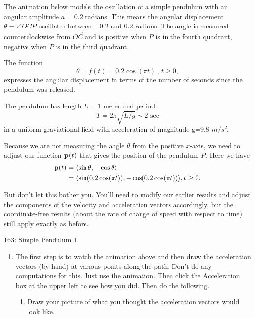 \documentclass{ximera}
\begin{document}
\begin{question} \label{Qdsf3r34r5rt}
The animation below models the oscillation of a simple pendulum with an angular amplitude $a=0.2$ radians. This means the angular displacement $\theta  = \angle OCP$ oscillates between $-0.2$ and $0.2$ radians. The angle is measured counterclockwise from $\overrightarrow{OC}$ and is positive when $P$ is in the fourth quadrant, negative when $P$ is in the third quadrant.

The function 
\[
      \theta = f(t) = 0.2 \cos (\pi t) \, , \, t\geq 0, 
\]
expresses the angular displacement in terms of the number of seconds since the pendulum was released. 

The pendulum has length $L=1$ meter and period
\[
  T  = 2\pi \sqrt{L/g} \sim 2 \text{ sec}
\]
in a uniform graviational field with acceleration of magnitude g=9.8 $m/s^2$.

Because we are not measuring the angle $\theta$ from the positive $x$-axis, we need to adjust our function ${\bf p}(t)$ that gives the position of the pendulum $P$. Here we have
\begin{align*}
   {\bf p}(t) &= \langle \sin \theta, -\cos\theta   \rangle  \\
                  &= \langle \sin (0.2 \cos (\pi t)), - \cos (0.2 \cos (\pi t)) \rangle  , t \geq 0.
\end{align*}

But don't let this bother you. You'll need to modify our earlier results and adjust the components of the velocity and acceleration vectors accordingly, but the coordinate-free results (about the rate of change of speed with respect to time) still apply exactly as before.


\begin{onlineOnly}
    \begin{center}
\end{center}
\end{onlineOnly}

\href{https://www.geogebra.org/classic/gkbsdkrd}{163: Simple Pendulum 1}

\begin{enumerate}
\item The first step is to watch the animation above and then draw the acceleration vectors (by hand) at various points along the path. Don't do any computations for this. Just use the animation. Then click the Acceleration box at the upper left to see how you did. Then do the following.
\begin{enumerate}
\item Draw your picture of what you thought the acceleration vectors would look like.


\end{enumerate}
\end{enumerate}
\end{question}
\end{document}
